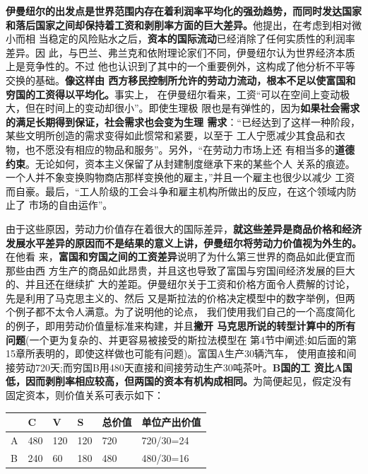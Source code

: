 \textbf{伊曼纽尔的出发点是世界范围内存在着利润率平均化的强劲趋势，而同时发达国家
  和落后国家之间却保持着工资和剥削率方面的巨大差异。}他提出，在考虑到相对微小而相
当稳定的风险贴水之后，\textbf{资本的国际流动}已经消除了任何实质性的利润率差异。因
此，与巴兰、弗兰克和依附理论家们不同，伊曼纽尔认为世界经济本质上是竞争性的。不过
他也认识到了其中的一个重要例外，这构成了他分析不平等交换的基础。\textbf{像这样由
  西方移民控制所允许的劳动力流动，根本不足以使富国和穷国的工资得以平均化。}事实上，
在伊曼纽尔看来，工资“可以在空间上变动极大，但在时间上的变动却很小”。即使生理极
限也是有弹性的，因为\textbf{如果社会需求的满足长期得到保证，社会需求也会变为生理
  需求}：“已经达到了这样一种阶段，某些文明所创造的需求变得如此惯常和紧要，以至于
工人宁愿减少其食品和衣物，也不愿没有相应的物品和服务”。另外，“在劳动力市场上还
有相当多的\textbf{道德约束}。无论如何，资本主义保留了从封建制度继承下来的某些个人
关系的痕迹。一个人并不象变换购物商店那样变换他的雇主，”并且一个雇主也很少以减少
工资而自豪。最后，“工人阶级的工会斗争和雇主机构所做出的反应，在这个领域内防止了
市场的自由运作”。

由于这些原因，劳动力价值存在着很大的国际差异，\textbf{就这些差异是商品价格和经济
  发展水平差异的原因而不是结果的意义上讲，伊曼纽尔将劳动力价值视为外生的。}在他看
来，\textbf{富国和穷国之间的工资差异}说明了为什么第三世界的商品如此便宜而那些由西
方生产的商品如此昂贵，并且这也导致了富国与穷国间经济发展的巨大的、并且还在继续扩
大的差距。伊曼纽尔关于工资和价格方面令人费解的讨论，先是利用了马克思主义的、然后
又是斯拉法的价格决定模型中的数字举例，但两个例子都不太令人满意。为了说明他的论点，
我们使用我们自己的一个高度简化的例子，即用劳动价值量标准来构建，并且\textbf{撇开
  马克思所说的转型计算中的所有问题}(一个更为复杂的、并更容易被接受的斯拉法模型在
第4节中阐述;如后面的第15章所表明的，即使这样做也可能有问题)。富国A生产30辆汽车，
使用直接和间接劳动720天;而穷国B用480天直接和间接劳动生产30吨茶叶。\textbf{B国的工
  资比A国低，因而剥削率相应较高，但两国的资本有机构成相同。}为简便起见，假定没有
固定资本，则价值关系可表示如下：

\begin{table}[H]
\centering
\begin{tabular}{@{}llllll@{}}
\toprule
  & C   & V   & S   & 总价值 & 单位产出价值    \\ \midrule
A & 480 & 120 & 120 & 720 & 720/30=24 \\
B & 240 & 60  & 180 & 480 & 480/30=16 \\ \bottomrule
\end{tabular}
\end{table}

